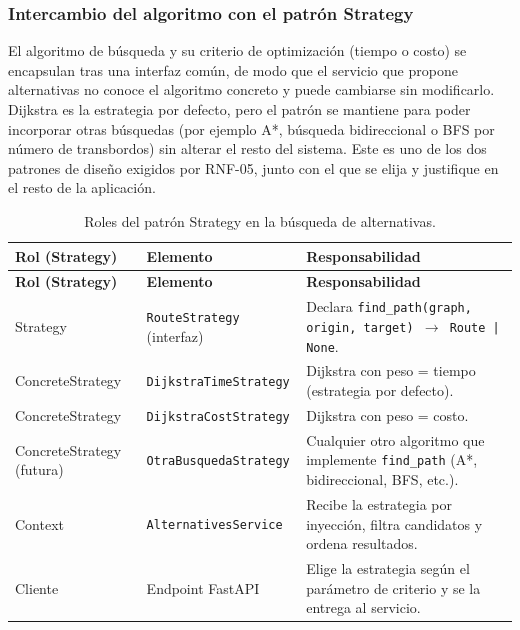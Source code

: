 \documentclass[11pt,a4paper]{article}
\begin{document}
\subsubsection{Intercambio del algoritmo con el patrón Strategy}
El algoritmo de búsqueda y su criterio de optimización (tiempo o costo) se encapsulan tras una interfaz común, de modo que el servicio que propone alternativas no conoce el algoritmo concreto y puede cambiarse sin modificarlo. Dijkstra es la estrategia por defecto, pero el patrón se mantiene para poder incorporar otras búsquedas (por ejemplo A*, búsqueda bidireccional o BFS por número de transbordos) sin alterar el resto del sistema. Este es uno de los dos patrones de diseño exigidos por RNF-05, junto con el que se elija y justifique en el resto de la aplicación.

{\footnotesize\setlength{\tabcolsep}{3pt}\renewcommand{\arraystretch}{1.15}
\begin{longtable}{|>{\raggedright\arraybackslash}p{2.98cm}|>{\raggedright\arraybackslash}p{5.08cm}|>{\raggedright\arraybackslash}p{7.48cm}|}
\caption{Roles del patrón Strategy en la búsqueda de alternativas.}\label{tab:strategy}\\ \hline
\rowcolor{gray!20} \textbf{Rol (Strategy)} & \textbf{Elemento} & \textbf{Responsabilidad} \\ \hline
\endfirsthead
\hline \rowcolor{gray!20} \textbf{Rol (Strategy)} & \textbf{Elemento} & \textbf{Responsabilidad} \\ \hline
\endhead
Strategy & \texttt{RouteStrategy} (interfaz) & Declara \texttt{find\_\allowbreak{}path(graph, origin, target) \ensuremath{\rightarrow} Route | None}. \\ \hline
ConcreteStrategy & \texttt{DijkstraTimeStrategy} & Dijkstra con peso = tiempo (estrategia por defecto). \\ \hline
ConcreteStrategy & \texttt{DijkstraCostStrategy} & Dijkstra con peso = costo. \\ \hline
ConcreteStrategy (futura) & \texttt{OtraBusquedaStrategy} & Cualquier otro algoritmo que implemente \texttt{find\_\allowbreak{}path} (A*, bidireccional, BFS, etc.). \\ \hline
Context & \texttt{AlternativesService} & Recibe la estrategia por inyección, filtra candidatos y ordena resultados. \\ \hline
Cliente & Endpoint FastAPI & Elige la estrategia según el parámetro de criterio y se la entrega al servicio. \\ \hline
\end{longtable}}
\end{document}

